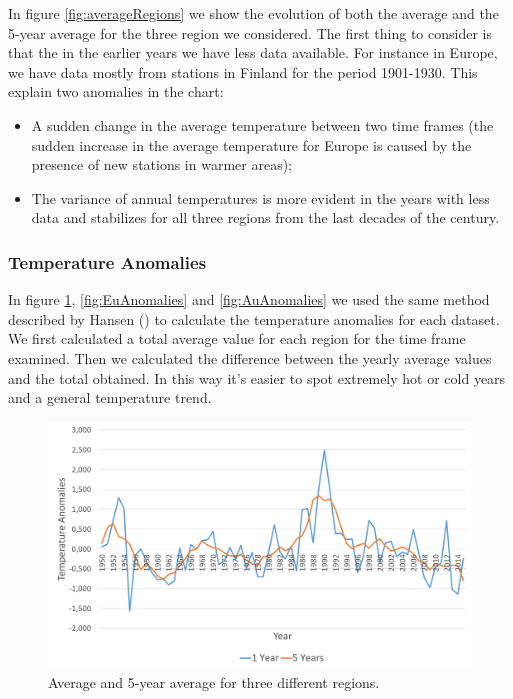 \documentclass{vldb}
\begin{document}
In figure \ref{fig:averageRegions} we show the evolution of both the average and the 5-year average for the three region we considered. The first thing to consider is that the in the earlier years we have less data available. For instance in Europe, we have data mostly from stations in Finland for the period 1901-1930. This explain two anomalies in the chart:
\begin{itemize}
    \item A sudden change in the average temperature between two time frames (the sudden increase in the average temperature for Europe is caused by the presence of new stations in warmer areas);
    \item The variance of annual temperatures is more evident in the years with less data and stabilizes for all three regions from the last decades of the century.
\end{itemize}

\subsubsection{Temperature Anomalies}
In figure \ref{fig:UsAnomalies}, \ref{fig:EuAnomalies} and \ref{fig:AuAnomalies} we used the same method described by Hansen (\cite{hansen1999giss}) to calculate the temperature anomalies for each dataset. We first calculated a total average value for each region for the time frame examined. Then we calculated the difference between the yearly average values and the total obtained. In this way it's easier to spot extremely hot or cold years and a general temperature trend. 


\begin{figure}[tbh]
\includegraphics[width=1\linewidth]{UsAnomalies}
\caption{Average and 5-year average for three different regions.}
\label{fig:UsAnomalies}
\end{figure}
\end{document}
